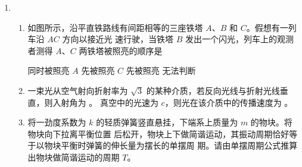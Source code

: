 \begin{enumerate}
\begin{enumerate}
\begin{enumerate}
\end{enumerate}
\begin{figure}[h!]
	\flushright
	
\end{figure}






	
\end{enumerate}



\item
{}
\begin{enumerate}
	\item
如图所示，沿平直铁路线有间距相等的三座铁塔 $ A $、$ B $ 和 $ C $。假想有一列车沿 $ AC $ 方向以接近光
速行驶，当铁塔 $ B $ 发出一个闪光，列车上的观测者测得 $ A $、$ C $ 两铁塔被照亮的顺序是  
\begin{figure}[h!]
	\centering
	
\end{figure}

\fourchoices
{同时被照亮}
{$ A $ 先被照亮}
{$ C $ 先被照亮}
{无法判断}



\item 
一束光从空气射向折射率为 $ \sqrt{3} $ 的某种介质，若反向光线与折射光线垂直，则入射角为 \underlinegap 。
真空中的光速为 $ c $，则光在该介质中的传播速度为 \underlinegap 。


\item 
将一劲度系数为 $ k $ 的轻质弹簧竖直悬挂，下端系上质量为 $ m $ 的物块。将物块向下拉离平衡位置
后松开，物块上下做简谐运动，其振动周期恰好等于以物块平衡时弹簧的伸长量为摆长的单摆周
期。请由单摆周期公式推算出物块做简谐运动的周期 $ T $。


\end{enumerate}


	
	
	
\end{enumerate}

